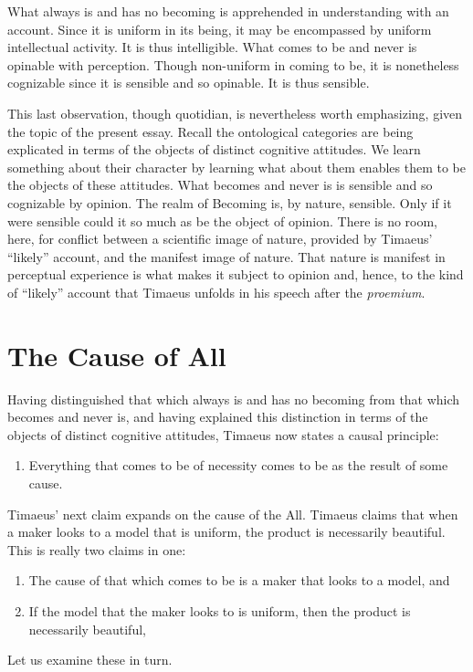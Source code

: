 What always is and has no becoming is apprehended in understanding with an account. Since it is uniform in its being, it may be encompassed by uniform intellectual activity. It is thus intelligible. What comes to be and never is opinable with perception. Though non-uniform in coming to be, it is nonetheless cognizable since it is sensible and so opinable. It is thus sensible.

This last observation, though quotidian, is nevertheless worth emphasizing, given the topic of the present essay. Recall the ontological categories are being explicated in terms of the objects of distinct cognitive attitudes. We learn something about their character by learning what about them enables them to be the objects of these attitudes. What becomes and never is is sensible and so cognizable by opinion. The realm of Becoming is, by nature, sensible. Only if it were sensible could it so much as be the object of opinion. There is no room, here, for conflict between a scientific image of nature, provided by Timaeus' ``likely'' account, and the manifest image of nature. That nature is manifest in perceptual experience is what makes it subject to opinion and, hence, to the kind of ``likely'' account that Timaeus unfolds in his speech after the \emph{proemium}.


\section{The Cause of All} %
\label{sec:the_cause_of_all}

Having distinguished that which always is and has no becoming from that which becomes and never is, and having explained this distinction in terms of the objects of distinct cognitive attitudes, Timaeus now states a causal principle:
\begin{enumerate}[(1)]
	\item Everything that comes to be of necessity comes to be as the result of some cause.
\end{enumerate}
Timaeus' next claim expands on the cause of the All. Timaeus claims that when a maker looks to a model that is uniform, the product is necessarily beautiful. This is really two claims in one:
\begin{enumerate}[(1)]\addtocounter{enumi}{1}
	\item The cause of that which comes to be is a maker that looks to a model, and
	\item If the model that the maker looks to is uniform, then the product is necessarily beautiful,
\end{enumerate}
Let us examine these in turn.

